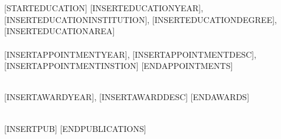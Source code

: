 \NameBoldface{\color{\NameColor}{\NameSize [INSERTNAME] ([INSERTROLE]):}}\\
[INSERTAFFILIATION]

\SectionSpacing
{}\\
[STARTEDUCATION]
[INSERTEDUCATIONYEAR], [INSERTEDUCATIONINSTITUTION], [INSERTEDUCATIONDEGREE], [INSERTEDUCATIONAREA]\\
[ENDEDUCATION]

\SectionSpacing
{}\\
[STARTAPPOINTMENTS]
[INSERTAPPOINTMENTYEAR], [INSERTAPPOINTMENTDESC], [INSERTAPPOINTMENTINSTION]
[ENDAPPOINTMENTS]

\SectionSpacing
{}\\
[STARTAWARDS]
[INSERTAWARDYEAR], [INSERTAWARDDESC]
[ENDAWARDS]

\SectionSpacing
{}\\
[STARTPUBLICATIONS]
{\PublicationBullet}[INSERTPUB]
[ENDPUBLICATIONS]

